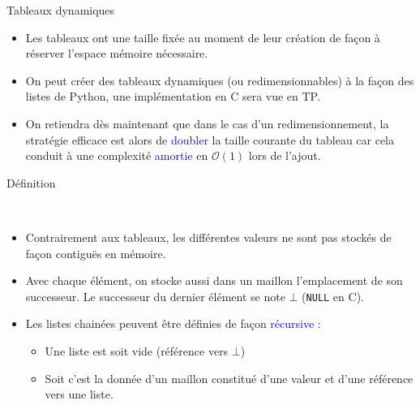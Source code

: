\documentclass[10pt]{beamer}
\begin{document}
\begin{frame}{\Ctitle}{\stitle}
	\begin{block}{Tableaux dynamiques}
		\begin{itemize}
			\item<1-> Les tableaux ont une taille fixée au moment de leur création de façon à réserver l'espace mémoire nécessaire.
			\item<2-> On peut créer des tableaux dynamiques (ou redimensionnables) à la façon des listes de Python, une implémentation en C sera vue en TP.
			\item<3-> On retiendra dès maintenant que dans le cas d'un redimensionnement, la stratégie efficace est alors de \textcolor{blue}{doubler} la taille courante du tableau car cela conduit à une complexité \textcolor{blue}{amortie} en $\mathcal{O}(1)$ lors de l'ajout.
		\end{itemize}
	\end{block}
\end{frame}


\begin{frame}{\Ctitle}{\stitle}
	\begin{alertblock}{Définition}
		\begin{center}
			  \quad {} \          \  
		\end{center}
		\begin{itemize}
			\item<2-> Contrairement aux tableaux, les différentes valeurs ne sont pas stockés de façon contiguës en mémoire.
			\item<3-> Avec chaque élément, on stocke aussi dans un \og{} maillon \fg{} l'emplacement de son successeur. Le successeur du dernier élément se note $\bot$ (\texttt{NULL} en C).
			\item<6-> Les listes chainées peuvent être définies de façon \textcolor{blue}{récursive} :
				\begin{itemize}
					\item<7-> Une liste est soit vide (référence vers $\bot$)
					\item<8-> Soit c'est la donnée d'un maillon constitué d'une valeur et d'une référence vers une liste.
				\end{itemize}
		\end{itemize}
	\end{alertblock}
\end{frame}
\end{document}
